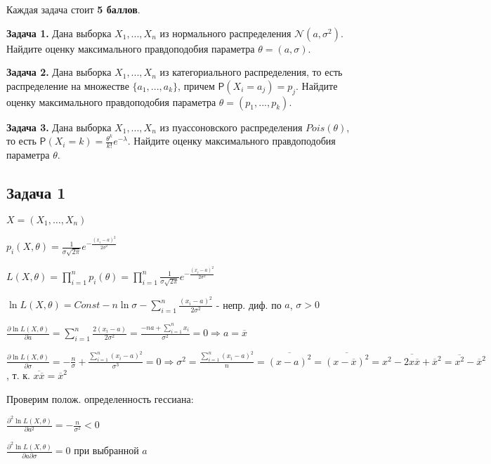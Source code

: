 \documentclass[11pt]{article}
\begin{document}
Каждая задача стоит \textbf{5 баллов}.

\textbf{Задача 1.} Дана выборка \(X_1, ..., X_n\) из нормального
распределения \(\mathcal{N}(a, \sigma^2)\). Найдите оценку максимального
правдоподобия параметра \(\theta = (a, \sigma)\).

\textbf{Задача 2.} Дана выборка \(X_1, ..., X_n\) из категориального
распределения, то есть распределение на множестве \(\{a_1, ..., a_k\}\),
причем \(\mathsf{P}(X_i = a_j) = p_j\). Найдите оценку максимального
правдоподобия параметра \(\theta = (p_1, ..., p_k)\).

\textbf{Задача 3.} Дана выборка \(X_1, ..., X_n\) из пуассоновского
распределения \(Pois(\theta)\), то есть
\(\mathsf{P}(X_i = k) = \frac{\theta^k}{k!}e^{-\lambda}\). Найдите
оценку максимального правдоподобия параметра \(\theta\).

    \hypertarget{ux437ux430ux434ux430ux447ux430-1}{%
\subsection{Задача 1}\label{ux437ux430ux434ux430ux447ux430-1}}

    \(X = (X_1, \ldots, X_n)\)

\(p_i(X, \theta) = \frac{1}{\sigma\sqrt{2\pi}}e^{-\frac{(x_i-a)^2}{2\sigma^2}}\)

\(L(X, \theta) = \prod\limits_{i=1}^n p_i(\theta) = \prod\limits_{i=1}^n \frac{1}{\sigma\sqrt{2\pi}}e^{-\frac{(x_i-a)^2}{2\sigma^2}}\)

\(\ln L(X, \theta) = Const - n\ln\sigma - \sum\limits_{i=1}^n \frac{(x_i - a)^2}{2\sigma^2}\)
- непр. диф. по \(a\), \(\sigma > 0\)

    \(\frac{\partial\ln L(X, \theta)}{\partial a} = \sum\limits_{i=1}^n\frac{2(x_i-a)}{2\sigma^2} = \frac{-na + \sum\limits_{i=1}^n x_i}{\sigma^2} = 0 \Rightarrow a = \overline{x}\)

\(\frac{\partial\ln L(X, \theta)}{\partial \sigma} = -\frac{n}{\sigma} + \frac{\sum\limits_{i=1}^n (x_i - a)^2}{\sigma^3} = 0 \Rightarrow \sigma^2 = \frac{\sum\limits_{i=1}^n (x_i - a)^2}{n} = \overline{(x-a)^2} = \overline{(x-\overline{x})^2} = \overline{x^2-2x\overline{x}+\overline{x}^2} = \overline{x^2} - \overline{x}^2\),
т. к. \(\overline{x\overline{x}} = \overline{x}^2\)

Проверим полож. определенность гессиана:

\(\frac{\partial^2\ln L(X, \theta)}{\partial a^2} = -\frac{n}{\sigma^2} < 0\)

\(\frac{\partial^2\ln L(X, \theta)}{\partial a \partial\sigma} = 0\) при
выбранной \(a\)
\end{document}
